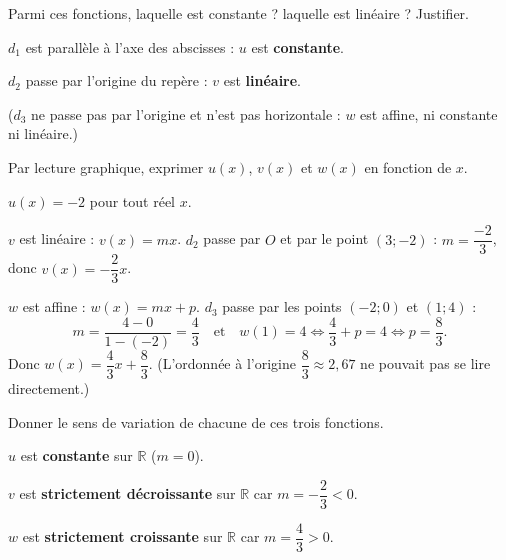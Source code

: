 \documentclass[12pt,a4paper]{book}
\begin{document}
\begin{enumMet}
	\item Parmi ces fonctions, laquelle est constante ? laquelle est linéaire ? Justifier.

	\begin{corrBox}
		$d_1$ est parallèle à l'axe des abscisses : $u$ est \textbf{constante}.

		$d_2$ passe par l'origine du repère : $v$ est \textbf{linéaire}.

		($d_3$ ne passe pas par l'origine et n'est pas horizontale : $w$ est affine, ni constante ni linéaire.)
	\end{corrBox}
	\item Par lecture graphique, exprimer $u(x)$, $v(x)$ et $w(x)$ en fonction de $x$.

	\begin{corrBox}
		$u(x)=-2$ pour tout réel $x$.

		$v$ est linéaire : $v(x)=mx$. $d_2$ passe par $O$ et par le point $(3;-2)$ : $m=\dfrac{-2}{3}$, donc $v(x)=-\dfrac{2}{3}x$.

		$w$ est affine : $w(x)=mx+p$. $d_3$ passe par les points $(-2;0)$ et $(1;4)$ :
		\[m=\frac{4-0}{1-(-2)}=\frac{4}{3}\quad\text{et}\quad w(1)=4 \iff \frac{4}{3}+p=4 \iff p=\frac{8}{3}.\]
		Donc $w(x)=\dfrac{4}{3}x+\dfrac{8}{3}$. (L'ordonnée à l'origine $\dfrac{8}{3}\approx 2,67$ ne pouvait pas se lire directement.)
	\end{corrBox}
	\item Donner le sens de variation de chacune de ces trois fonctions.

	\begin{corrBox}
		$u$ est \textbf{constante} sur $\mathbb{R}$ ($m=0$).

		$v$ est \textbf{strictement décroissante} sur $\mathbb{R}$ car $m=-\dfrac{2}{3}<0$.

		$w$ est \textbf{strictement croissante} sur $\mathbb{R}$ car $m=\dfrac{4}{3}>0$.
	\end{corrBox}
\end{enumMet}

\exerciceDS{}
\end{document}
